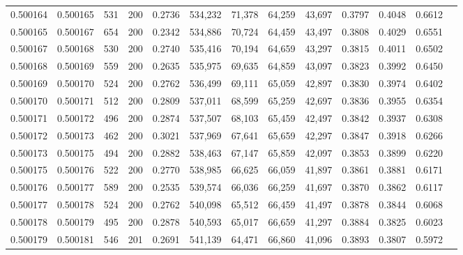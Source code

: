 \begin{tabular}{rrrrrrrrrrrrr}
0.500164 & 0.500165 &    531 & 200 &                                     0.2736 & 534,232 &  71,378 &  64,259 &  43,697 & 0.3797 & 0.4048 & 0.6612 \\
0.500165 & 0.500167 &    654 & 200 &                                     0.2342 & 534,886 &  70,724 &  64,459 &  43,497 & 0.3808 & 0.4029 & 0.6551 \\
0.500167 & 0.500168 &    530 & 200 &                                     0.2740 & 535,416 &  70,194 &  64,659 &  43,297 & 0.3815 & 0.4011 & 0.6502 \\
0.500168 & 0.500169 &    559 & 200 &                                     0.2635 & 535,975 &  69,635 &  64,859 &  43,097 & 0.3823 & 0.3992 & 0.6450 \\
0.500169 & 0.500170 &    524 & 200 &                                     0.2762 & 536,499 &  69,111 &  65,059 &  42,897 & 0.3830 & 0.3974 & 0.6402 \\
0.500170 & 0.500171 &    512 & 200 &                                     0.2809 & 537,011 &  68,599 &  65,259 &  42,697 & 0.3836 & 0.3955 & 0.6354 \\
0.500171 & 0.500172 &    496 & 200 &                                     0.2874 & 537,507 &  68,103 &  65,459 &  42,497 & 0.3842 & 0.3937 & 0.6308 \\
0.500172 & 0.500173 &    462 & 200 &                                     0.3021 & 537,969 &  67,641 &  65,659 &  42,297 & 0.3847 & 0.3918 & 0.6266 \\
0.500173 & 0.500175 &    494 & 200 &                                     0.2882 & 538,463 &  67,147 &  65,859 &  42,097 & 0.3853 & 0.3899 & 0.6220 \\
0.500175 & 0.500176 &    522 & 200 &                                     0.2770 & 538,985 &  66,625 &  66,059 &  41,897 & 0.3861 & 0.3881 & 0.6171 \\
0.500176 & 0.500177 &    589 & 200 &                                     0.2535 & 539,574 &  66,036 &  66,259 &  41,697 & 0.3870 & 0.3862 & 0.6117 \\
0.500177 & 0.500178 &    524 & 200 &                                     0.2762 & 540,098 &  65,512 &  66,459 &  41,497 & 0.3878 & 0.3844 & 0.6068 \\
0.500178 & 0.500179 &    495 & 200 &                                     0.2878 & 540,593 &  65,017 &  66,659 &  41,297 & 0.3884 & 0.3825 & 0.6023 \\
0.500179 & 0.500181 &    546 & 201 &                                     0.2691 & 541,139 &  64,471 &  66,860 &  41,096 & 0.3893 & 0.3807 & 0.5972 \\

\end{tabular}
